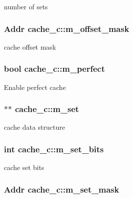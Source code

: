 \label{classcache__c_a1e7c693df55654e3c37aa5e8fcf80272}
number of sets \hypertarget{classcache__c_a5ef86cd4af3066379bfc31861acf1e20}{
\subsubsection[{m\_\-offset\_\-mask}]{\setlength{\rightskip}{0pt plus 5cm}Addr {\bf cache\_\-c::m\_\-offset\_\-mask}}}
\label{classcache__c_a5ef86cd4af3066379bfc31861acf1e20}
cache offset mask \hypertarget{classcache__c_a1856fce04cc6a1af8bb9865271a12f91}{
\subsubsection[{m\_\-perfect}]{\setlength{\rightskip}{0pt plus 5cm}bool {\bf cache\_\-c::m\_\-perfect}}}
\label{classcache__c_a1856fce04cc6a1af8bb9865271a12f91}
Enable perfect cache \hypertarget{classcache__c_a6949d947258bcc25faf8c3c751042056}{
\subsubsection[{m\_\-set}]{$\ast$$\ast$ {\bf cache\_\-c::m\_\-set}}}
\label{classcache__c_a6949d947258bcc25faf8c3c751042056}
cache data structure \hypertarget{classcache__c_a9ad9a67a9325d355365b35aed1c4a77c}{
\subsubsection[{m\_\-set\_\-bits}]{\setlength{\rightskip}{0pt plus 5cm}int {\bf cache\_\-c::m\_\-set\_\-bits}}}
\label{classcache__c_a9ad9a67a9325d355365b35aed1c4a77c}
cache set bits \hypertarget{classcache__c_a4d0db9dfcbb07b40e41881ca8579f7b0}{
\subsubsection[{m\_\-set\_\-mask}]{\setlength{\rightskip}{0pt plus 5cm}Addr {\bf cache\_\-c::m\_\-set\_\-mask}}}
